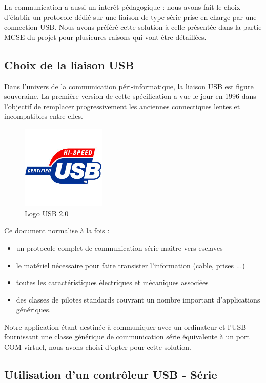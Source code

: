 \documentclass[11pt, french]{article} %
\begin{document}
La communication a aussi un interêt pédagogique : nous avons fait le choix d'établir un protocole dédié sur une liaison de type série prise en charge par une connection USB. Nous avons préféré cette solution à celle présentée dans la partie MCSE du projet pour plusieures raisons qui vont être détaillées.

\subsection{Choix de la liaison USB}
	
Dans l'univers de la communication péri-informatique, la liaison USB est figure souveraine. La première version de cette spécification a vue le jour en 1996 dans l'objectif de remplacer progressivement les anciennes connectiques lentes et incompatibles entre elles.

\begin{figure}
	\includegraphics[width = 4cm]{SolutionNumerique/usb-logo.jpg}
	\caption{Logo USB 2.0}
\end{figure}

\medskip
Ce document normalise à la fois : 
\medskip
\begin{itemize}
	\item un protocole complet de communication série maitre vers esclaves
	\item le matériel nécessaire pour faire transister l'information (cable, prises ...)
	\item toutes les caractéristiques électriques et mécaniques associées
	\item des classes de pilotes standards couvrant un nombre important d'applications génériques.
\end{itemize}

\medskip
Notre application étant destinée à communiquer avec un ordinateur et l'USB fournissant une classe générique de communication série équivalente à un port COM virtuel, nous avons choisi d'opter pour cette solution.

\subsection{Utilisation d'un contrôleur USB - Série}
\end{document}
